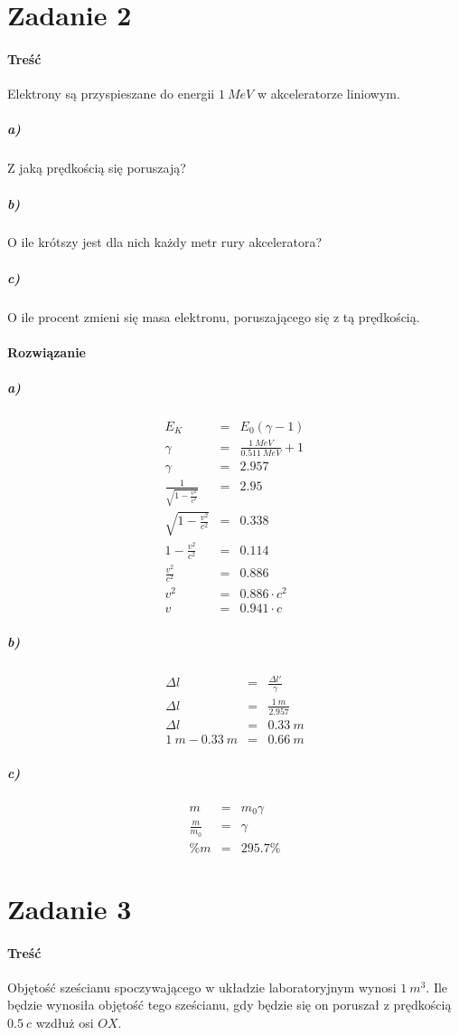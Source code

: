 \documentclass [a4paper, 11pt, oneside]{book}
\begin{document}
	\section{Zadanie 2} %
	\label{sec:zadanie_2}
		\paragraph{Treść}Elektrony są przyspieszane do energii $1~MeV$ w akceleratorze liniowym.
		\subparagraph{a)}Z jaką prędkością się poruszają?
		\subparagraph{b)}O ile krótszy jest dla nich każdy metr rury akceleratora?
		\subparagraph{c)}O ile procent zmieni się masa elektronu, poruszającego się z tą prędkością.
		\paragraph{Rozwiązanie}
		\subparagraph{a)}
		\begin{eqnarray*}
			E_K & = & E_0(\gamma-1)\\
			\gamma & = & \frac{1~MeV}{0.511~MeV}+1\\
			\gamma & = & 2.957\\
			\frac{1}{\sqrt{1-\frac{v^2}{c^2}}} & = & 2.95\\
			\sqrt{1-\frac{v^2}{c^2}} & = & 0.338\\
			1-\frac{v^2}{c^2} &=& 0.114\\
			\frac{v^2}{c^2} & = & 0.886\\
			v^2 & = & 0.886\cdot c^2\\
			v & = & 0.941\cdot c
		\end{eqnarray*}
		\subparagraph{b)}
		\begin{eqnarray*}
			\Delta l &=& \frac{\Delta l'}{\gamma}\\
			\Delta l & = & \frac{1~m}{2.957}\\
			\Delta l & = & 0.33~m\\
			1~m-0.33~m & = & 0.66~m
		\end{eqnarray*}
		\subparagraph{c)}
			\begin{eqnarray*}
				m & = & m_0\gamma\\
				\frac{m}{m_0} &=& \gamma\\
				\%m &=& 295.7\%
			\end{eqnarray*}
	\section{Zadanie 3} %
	\label{sec:zadanie_3}
		\paragraph{Treść} Objętość sześcianu spoczywającego w układzie laboratoryjnym wynosi $1~m^3$. Ile będzie wynosiła objętość tego sześcianu, gdy będzie się on poruszał z prędkością $0.5~c$ wzdłuż osi $OX$.
\end{document}
